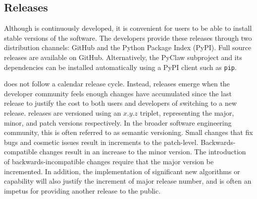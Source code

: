 \subsection{Releases}

Although \clawpack is continuously developed, it is convenient for
users to be able to install stable versions of the software.  The
\clawpack developers provide these releases through two distribution
channels: GitHub and the Python Package Index (PyPI).  Full source
releases are available on GitHub.  Alternatively, the PyClaw
subproject and its dependencies can be installed automatically using a
PyPI client such as \texttt{pip}.

\clawpack does not follow a calendar release cycle.  Instead, releases
emerge when the developer community feels enough changes have
accumulated since the last release to justify the cost to both users
and developers of switching to a new release.  \clawpack releases are
versioned using an $x.y.z$ triplet, representing the major, minor, and
patch versions respectively.  In the broader software engineering
community, this is often referred to as semantic versioning.  Small
changes that fix bugs and cosmetic issues result in increments to the
patch-level.  Backwards-compatible changes result in an increase to
the minor version.  The introduction of backwards-incompatible changes
require that the major version be incremented.  In addition, the
implementation of significant new algorithms or capability will also
justify the increment of major release number, and is often an impetus
for providing another release to the public.
